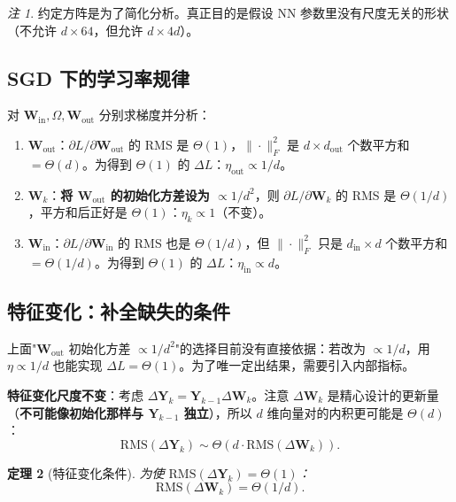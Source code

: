 \documentclass[11pt,a4paper]{ctexart}
\newtheorem{theorem}{定理}[section]
\theoremstyle{definition}
\theoremstyle{remark}
\newtheorem{remark}[theorem]{注}
\newcommand{\RMS}{\mathrm{RMS}}
\newcommand{\bigT}{\Theta}
\begin{document}
\begin{remark}
约定方阵是为了简化分析。真正目的是假设 NN 参数里没有尺度无关的形状（不允许 $d\times 64$，但允许 $d \times 4d$）。
\end{remark}
 
\subsection{SGD 下的学习率规律}
 
对 $\bm{W}_\text{in}, \Omega, \bm{W}_\text{out}$ 分别求梯度并分析：
\begin{enumerate}
    \item \textbf{$\bm{W}_\text{out}$}：$\partial L/\partial \bm{W}_\text{out}$ 的 RMS 是 $\bigT(1)$，$\|\cdot\|_F^2$ 是 $d \times d_\text{out}$ 个数平方和 $= \bigT(d)$。为得到 $\bigT(1)$ 的 $\Delta L$：$\boxed{\eta_\text{out} \propto 1/d}$。
    
    \item \textbf{$\bm{W}_k$}：\textbf{将 $\bm{W}_\text{out}$ 的初始化方差设为 $\propto 1/d^2$}，则 $\partial L/\partial \bm{W}_k$ 的 RMS 是 $\bigT(1/d)$，平方和后正好是 $\bigT(1)$：$\boxed{\eta_k \propto 1}$（不变）。
    
    \item \textbf{$\bm{W}_\text{in}$}：$\partial L/\partial \bm{W}_\text{in}$ 的 RMS 也是 $\bigT(1/d)$，但 $\|\cdot\|_F^2$ 只是 $d_\text{in} \times d$ 个数平方和 $= \bigT(1/d)$。为得到 $\bigT(1)$ 的 $\Delta L$：$\boxed{\eta_\text{in} \propto d}$。
\end{enumerate}
 
\subsection{特征变化：补全缺失的条件}
 
上面"$\bm{W}_\text{out}$ 初始化方差 $\propto 1/d^2$"的选择目前没有直接依据：若改为 $\propto 1/d$，用 $\eta \propto 1/d$ 也能实现 $\Delta L = \bigT(1)$。为了唯一定出结果，需要引入内部指标。
 
\textbf{特征变化尺度不变}：考虑 $\Delta \bm{Y}_k = \bm{Y}_{k-1} \Delta\bm{W}_k$。注意 $\Delta\bm{W}_k$ 是精心设计的更新量（\textbf{不可能像初始化那样与 $\bm{Y}_{k-1}$ 独立}），所以 $d$ 维向量对的内积更可能是 $\bigT(d)$：
\[
\RMS(\Delta \bm{Y}_k) \sim \bigT(d \cdot \RMS(\Delta\bm{W}_k)).
\]
 
\begin{theorem}[特征变化条件]
为使 $\RMS(\Delta \bm{Y}_k) = \bigT(1)$：
\begin{equation}
\RMS(\Delta\bm{W}_k) = \bigT(1/d).
\end{equation}
\end{theorem}
 
\end{document}
